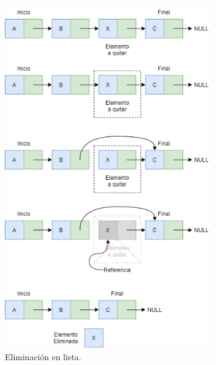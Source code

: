 \documentclass[titlepage,a4paper]{article}
\begin{document}
\begin{figure}[H]
\centering
\includegraphics[width=0.8\textwidth]{lista_quitar.png}
\caption{\label{fig:seq07}Eliminación en lista.}
\end{figure}
\end{document}
